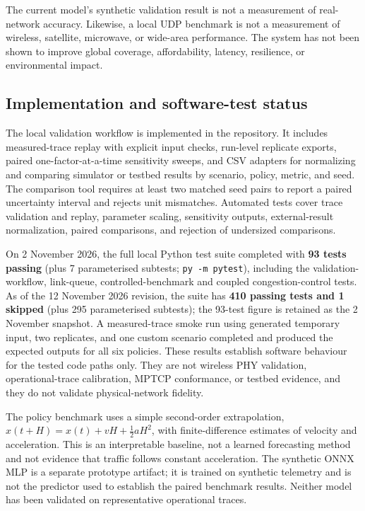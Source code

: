 \documentclass[
  american,
  11pt,
]{article}
\begin{document}
The current model's synthetic validation result is not a measurement of
real-network accuracy. Likewise, a local UDP benchmark is not a
measurement of wireless, satellite, microwave, or wide-area performance.
The system has not been shown to improve global coverage, affordability,
latency, resilience, or environmental impact.

\subsection{Implementation and software-test
status}\label{implementation-and-software-test-status}

The local validation workflow is implemented in the repository. It
includes measured-trace replay with explicit input checks, run-level
replicate exports, paired one-factor-at-a-time sensitivity sweeps, and
CSV adapters for normalizing and comparing simulator or testbed results
by scenario, policy, metric, and seed. The comparison tool requires at
least two matched seed pairs to report a paired uncertainty interval and
rejects unit mismatches. Automated tests cover trace validation and
replay, parameter scaling, sensitivity outputs, external-result
normalization, paired comparisons, and rejection of undersized
comparisons.

On 2 November 2026, the full local Python test suite completed with
\textbf{93 tests passing} (plus 7 parameterised subtests;
\texttt{py\ -m\ pytest}), including the validation-workflow, link-queue,
controlled-benchmark and coupled congestion-control tests. As of the 12
November 2026 revision, the suite has \textbf{410 passing tests and 1
skipped} (plus 295 parameterised subtests); the 93-test figure is
retained as the 2 November snapshot. A measured-trace smoke run using
generated temporary input, two replicates, and one custom scenario
completed and produced the expected outputs for all six policies. These
results establish software behaviour for the tested code paths only.
They are not wireless PHY validation, operational-trace calibration,
MPTCP conformance, or testbed evidence, and they do not validate
physical-network fidelity.

The policy benchmark uses a simple second-order extrapolation,
\(\hat{x}(t+H)=x(t)+vH+\tfrac{1}{2}aH^2\), with finite-difference
estimates of velocity and acceleration. This is an interpretable
baseline, not a learned forecasting method and not evidence that traffic
follows constant acceleration. The synthetic ONNX MLP is a separate
prototype artifact; it is trained on synthetic telemetry and is not the
predictor used to establish the paired benchmark results. Neither model
has been validated on representative operational traces.
\end{document}
